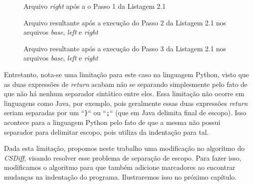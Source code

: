 \begin{figure}[ht]
	\begin{center}
		
		\caption{Arquivo \emph{right} após a o Passo 1 da
			Listagem 2.1}\label{right_marcadores}
	\end{center}
\end{figure}

\begin{figure}[ht]
	\begin{center}
		
		\caption{Arquivo resultante após a execução do Passo 2 da
			Listagem 2.1 nos arquivos \emph{base}, \emph{left} e
			\emph{right}}\label{diff3_marcadores}
	\end{center}
\end{figure}

\begin{figure}[ht]
	\begin{center}
		
		\caption{Arquivo resultante após a execução do Passo 3 da
			Listagem 2.1 nos arquivos \emph{base}, \emph{left} e
			\emph{right}}\label{csdiff_before}
	\end{center}
\end{figure}

Entretanto, nota-se uma limitação para este caso na linguagem Python, visto que
as duas expressões de \emph{return} acabam não se separando simplesmente pelo
fato de que não há nenhum separador sintático entre eles. Essa limitação não
ocorre em linguagens como Java, por exemplo, pois geralmente essas duas
expressões \emph{return} seriam separadas por um ``\verb|}|`` ou ``\verb|;|``
(que em Java delimita final de escopo). Isso acontece para a linguagem Python
pelo fato de que a mesma não possui separador para delimitar escopo, pois
utiliza da indentação para tal.

Dada esta limitação, propomos neste trabalho uma modificação no algoritmo do
\emph{CSDiff}, visando resolver esse problema de separação de escopo. Para
fazer isso, modificamos o algoritmo para que também adicione marcadores ao
encontrar mudanças na indentação do programa. Ilustraremos isso no próximo
capítulo.




